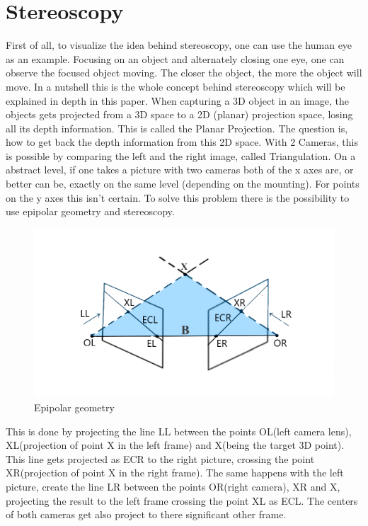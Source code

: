 \documentclass[journal,onecolumn]{IEEEtran}
\begin{document}
\section{Stereoscopy}
\noindent
First of all, to visualize the idea behind stereoscopy, one can use the human eye as an example. Focusing on an object and alternately closing one eye, one can observe the focused  object moving. The closer the object, the more the object will move. In a nutshell this is the whole concept behind stereoscopy which will be explained in depth in this paper.
When capturing a 3D object in an image, the objects gets projected from a 3D space to a 2D (planar) projection space, losing all its depth information. This is called the Planar Projection. The question is, how to get back the depth information from this 2D space.
With 2 Cameras, this is possible by comparing the left and the right image, called Triangulation.
On a abstract level, if one takes a picture with two cameras both of the x axes are, or better can be, exactly on the same level (depending on the mounting). For points on the y axes this isn't certain. To solve this problem there is the possibility to use epipolar geometry and stereoscopy.
\begin{figure}[H]
	\centering
	\includegraphics[scale=0.5]{epipolarGeometry.png}
	\captionsetup{justification=centering}
	\caption{Epipolar geometry}
\end{figure}
\noindent This is done by projecting the line LL between the points OL(left camera lens), XL(projection of point X in the left frame) and X(being the target 3D point). This line gets projected as ECR to the right picture, crossing the point XR(projection of point X in the right frame). The same happens with the left picture, create the line LR between the points OR(right camera), XR and X, projecting the result to the left frame crossing the point XL as ECL. The centers of both cameras get also project to there significant other frame. \newline
\end{document}
